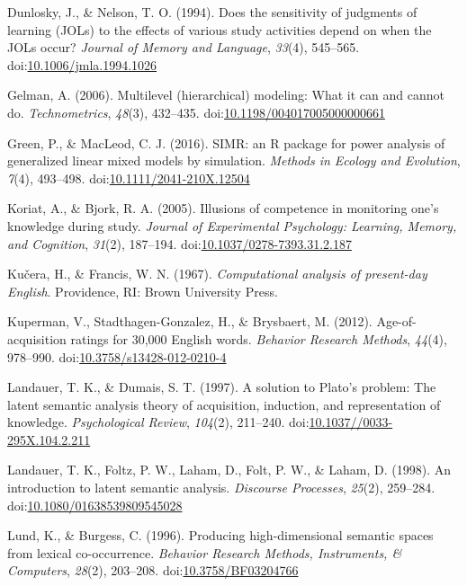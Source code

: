 \documentclass[english,man]{apa6}
\theoremstyle{definition}
\theoremstyle{definition}
\theoremstyle{definition}
\theoremstyle{remark}
\begin{document}
\hypertarget{ref-Dunlosky1994a}{}
Dunlosky, J., \& Nelson, T. O. (1994). Does the sensitivity of judgments
of learning (JOLs) to the effects of various study activities depend on
when the JOLs occur? \emph{Journal of Memory and Language},
\emph{33}(4), 545--565.
doi:\href{https://doi.org/10.1006/jmla.1994.1026}{10.1006/jmla.1994.1026}

\hypertarget{ref-Gelman2006}{}
Gelman, A. (2006). Multilevel (hierarchical) modeling: What it can and
cannot do. \emph{Technometrics}, \emph{48}(3), 432--435.
doi:\href{https://doi.org/10.1198/004017005000000661}{10.1198/004017005000000661}

\hypertarget{ref-Green2016}{}
Green, P., \& MacLeod, C. J. (2016). SIMR: an R package for power
analysis of generalized linear mixed models by simulation. \emph{Methods
in Ecology and Evolution}, \emph{7}(4), 493--498.
doi:\href{https://doi.org/10.1111/2041-210X.12504}{10.1111/2041-210X.12504}

\hypertarget{ref-Koriat2005}{}
Koriat, A., \& Bjork, R. A. (2005). Illusions of competence in
monitoring one's knowledge during study. \emph{Journal of Experimental
Psychology: Learning, Memory, and Cognition}, \emph{31}(2), 187--194.
doi:\href{https://doi.org/10.1037/0278-7393.31.2.187}{10.1037/0278-7393.31.2.187}

\hypertarget{ref-Kucera1967}{}
Kučera, H., \& Francis, W. N. (1967). \emph{Computational analysis of
present-day English}. Providence, RI: Brown University Press.

\hypertarget{ref-Kuperman2012}{}
Kuperman, V., Stadthagen-Gonzalez, H., \& Brysbaert, M. (2012).
Age-of-acquisition ratings for 30,000 English words. \emph{Behavior
Research Methods}, \emph{44}(4), 978--990.
doi:\href{https://doi.org/10.3758/s13428-012-0210-4}{10.3758/s13428-012-0210-4}

\hypertarget{ref-Landauer1997}{}
Landauer, T. K., \& Dumais, S. T. (1997). A solution to Plato's problem:
The latent semantic analysis theory of acquisition, induction, and
representation of knowledge. \emph{Psychological Review}, \emph{104}(2),
211--240.
doi:\href{https://doi.org/10.1037//0033-295X.104.2.211}{10.1037//0033-295X.104.2.211}

\hypertarget{ref-Landauer1998}{}
Landauer, T. K., Foltz, P. W., Laham, D., Folt, P. W., \& Laham, D.
(1998). An introduction to latent semantic analysis. \emph{Discourse
Processes}, \emph{25}(2), 259--284.
doi:\href{https://doi.org/10.1080/01638539809545028}{10.1080/01638539809545028}

\hypertarget{ref-Lund1996}{}
Lund, K., \& Burgess, C. (1996). Producing high-dimensional semantic
spaces from lexical co-occurrence. \emph{Behavior Research Methods,
Instruments, \& Computers}, \emph{28}(2), 203--208.
doi:\href{https://doi.org/10.3758/BF03204766}{10.3758/BF03204766}
\end{document}
